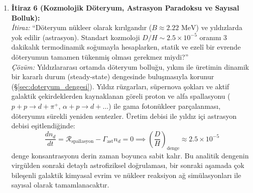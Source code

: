 \begin{enumerate}
    \item \textbf{İtiraz 6 (Kozmolojik Döteryum, Astrasyon Paradoksu ve Sayısal Bolluk):} \\
          \textit{İtiraz:} ``Döteryum nükleer olarak kırılgandır ($B \approx 2.22\text{ MeV}$) ve yıldızlarda yok edilir (astrasyon). Standart kozmoloji $D/H \sim 2.5 \times 10^{-5}$ oranını 3 dakikalık termodinamik soğumayla hesaplarken, statik ve ezelî bir evrende döteryumun tamamen tükenmiş olması gerekmez miydi?'' \\
          \textit{Çözüm:} Yıldızlararası ortamda döteryum bolluğu, yıkım ile üretimin dinamik bir kararlı durum (steady-state) dengesinde buluşmasıyla korunur (\S\ref{sec:doteryum_dengesi}). Yıldız rüzgarları, süpernova şokları ve aktif galaktik çekirdeklerden kaynaklanan göreli proton ve alfa spallasyonu ($p+p \to d+\pi^+$, $\alpha+p \to d+\dots$) ile gama fotonükleer parçalanması, döteryumu sürekli yeniden sentezler. Üretim debisi ile yıldız içi astrasyon debisi eşitlendiğinde:
          \begin{equation}
              \frac{d n_d}{dt} = \mathcal{R}_{\mathrm{spallasyon}} - \Gamma_{\mathrm{ast}} n_d = 0 \implies \left( \frac{D}{H} \right)_{\mathrm{denge}} \approx 2.5 \times 10^{-5}
          \end{equation}
          denge konsantrasyonu derin zaman boyunca sabit kalır. Bu analitik dengenin virgülden sonraki detaylı astrofiziksel doğrulaması, bir sonraki aşamada çok bileşenli galaktik kimyasal evrim ve nükleer reaksiyon ağ simülasyonları ile sayısal olarak tamamlanacaktır.


\end{enumerate}
